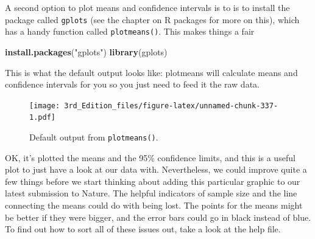 \documentclass[
]{book}
\newenvironment{Shaded}{\begin{snugshade}}{\end{snugshade}}
\newcommand{\DataTypeTok}[1]{\textcolor[rgb]{0.13,0.29,0.53}{#1}}
\newcommand{\DecValTok}[1]{\textcolor[rgb]{0.00,0.00,0.81}{#1}}
\newcommand{\FloatTok}[1]{\textcolor[rgb]{0.00,0.00,0.81}{#1}}
\newcommand{\KeywordTok}[1]{\textcolor[rgb]{0.13,0.29,0.53}{\textbf{#1}}}
\newcommand{\NormalTok}[1]{#1}
\newcommand{\OperatorTok}[1]{\textcolor[rgb]{0.81,0.36,0.00}{\textbf{#1}}}
\newcommand{\OtherTok}[1]{\textcolor[rgb]{0.56,0.35,0.01}{#1}}
\newcommand{\StringTok}[1]{\textcolor[rgb]{0.31,0.60,0.02}{#1}}
\begin{document}
A second option to plot means and confidence intervals is to is to install the package called \texttt{gplots} (see the chapter on R packages for more on this), which has a handy function called \texttt{plotmeans()}. This makes things a fair

\begin{Shaded}
\begin{Highlighting}[]
\KeywordTok{install.packages}\NormalTok{(}\StringTok{"gplots"}\NormalTok{)}
\KeywordTok{library}\NormalTok{(gplots)}
\end{Highlighting}
\end{Shaded}

This is what the default output looks like: plotmeans will calculate means and confidence intervals for you so you just need to feed it the raw data.

\begin{Shaded}
\end{Shaded}

\begin{figure}
\centering
\texttt{[image: 3rd\_Edition\_files/figure-latex/unnamed-chunk-337-1.pdf]}
\caption{\label{fig:unnamed-chunk-337}Default output from \texttt{plotmeans()}.}
\end{figure}

OK, it's plotted the means and the 95\% confidence limits, and this is a useful plot to just have a look at our data with. Nevertheless, we could improve quite a few things before we start thinking about adding this particular graphic to our latest submission to Nature. The helpful indicators of sample size and the line connecting the means could do with being lost. The points for the means might be better if they were bigger, and the error bars could go in black instead of blue. To find out how to sort all of these issues out, take a look at the help file.

\begin{Shaded}
\end{Shaded}
\end{document}
